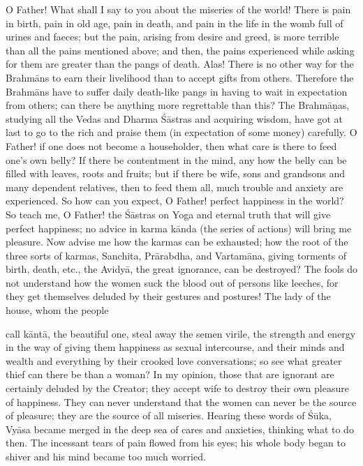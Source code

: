 O Father! What shall I say to you about the miseries of the world! There is pain in birth, pain in old age, pain in death, and pain in the life in the womb full of urines and faeces; but the pain, arising from desire and greed, is more terrible than all the pains mentioned above; and then, the pains experienced while asking for them are greater than the pangs of death. Alas! There is no other way for the Brahm\=ans to earn their livelihood than to accept gifts from others. Therefore the Brahm\=ans have to suffer daily death-like pangs in having to wait in expectation from others; can there be anything more regrettable than this? The Brahm\=a\d{n}as, studying all the Vedas and Dharma \'S\=astras and acquiring wisdom, have got at last to go to the rich and praise them (in expectation of some money) carefully. O Father! if one does not become a householder, then what care is there to feed one's own belly? If there be contentment in the mind, any how the belly can be filled with leaves, roots and fruits; but if there be wife, sons and grandsons and many dependent relatives, then to feed them all, much trouble and anxiety are experienced. So how can you expect, O Father! perfect happiness in the world? So teach me, O Father! the \'S\=astras on Yoga and eternal truth that will give perfect happiness; no advice in karma k\=anda (the series of actions) will bring me pleasure. Now advise me how the karmas can be exhausted; how the root of the three sorts of karmas, Sanchita, Pr\=arabdha, and Vartam\=ana, giving torments of birth, death, etc., the Avidy\=a, the great ignorance, can be destroyed? The fools do not understand how the women suck the blood out of persons like leeches, for they get themselves deluded by their gestures and postures! The lady of the house, whom the people

call k\=ant\=a, the beautiful one, steal away the semen virile, the strength and energy in the way of giving them happiness as sexual intercourse, and their minds and wealth and everything by their crooked love conversations; so see what greater thief can there be than a woman? In my opinion, those that are ignorant are certainly deluded by the Creator; they accept wife to destroy their own pleasure of happiness. They can never understand that the women can never be the source of pleasure; they are the source of all miseries. Hearing these words of \'S\=uka, Vy\=asa became merged in the deep sea of cares and anxieties, thinking what to do then. The incessant tears of pain flowed from his eyes; his whole body began to shiver and his mind became too much worried.

